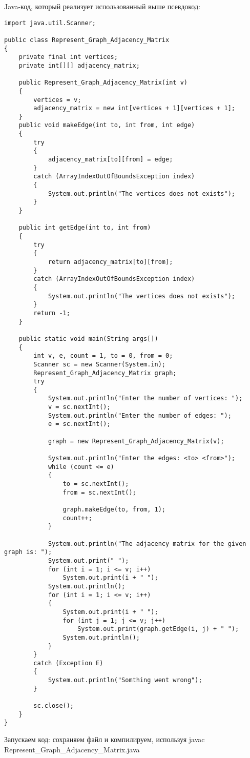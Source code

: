 \vspace{\baselineskip}
Java-код, который реализует использованный выше псевдокод:
\begin{tcolorbox}
\begin{verbatim}
import java.util.Scanner;

public class Represent_Graph_Adjacency_Matrix
{
	private final int vertices;
	private int[][] adjacency_matrix;
	
	public Represent_Graph_Adjacency_Matrix(int v)
	{
		vertices = v;
		adjacency_matrix = new int[vertices + 1][vertices + 1];
	}
	public void makeEdge(int to, int from, int edge)
	{
		try
		{
			adjacency_matrix[to][from] = edge;
		}
		catch (ArrayIndexOutOfBoundsException index)
		{
			System.out.println("The vertices does not exists");
		}
	}
	
	public int getEdge(int to, int from)
	{
		try
		{
			return adjacency_matrix[to][from];
		}
		catch (ArrayIndexOutOfBoundsException index)
		{
			System.out.println("The vertices does not exists");
		}
		return -1;
	}
	
	public static void main(String args[])
	{
		int v, e, count = 1, to = 0, from = 0;
		Scanner sc = new Scanner(System.in);
		Represent_Graph_Adjacency_Matrix graph;
		try
		{
			System.out.println("Enter the number of vertices: ");
			v = sc.nextInt();
			System.out.println("Enter the number of edges: ");
			e = sc.nextInt();
			
			graph = new Represent_Graph_Adjacency_Matrix(v);
			
			System.out.println("Enter the edges: <to> <from>");
			while (count <= e)
			{
				to = sc.nextInt();
				from = sc.nextInt();
				
				graph.makeEdge(to, from, 1);
				count++;
			}
			
			System.out.println("The adjacency matrix for the given graph is: ");
			System.out.print(" ");
			for (int i = 1; i <= v; i++)
				System.out.print(i + " ");
			System.out.println();
			for (int i = 1; i <= v; i++)
			{
				System.out.print(i + " ");
				for (int j = 1; j <= v; j++)
					System.out.print(graph.getEdge(i, j) + " ");
				System.out.println();
			}
		}
		catch (Exception E)
		{
			System.out.println("Somthing went wrong");
		}
		
		sc.close();
	}
}

\end{verbatim}
\end{tcolorbox}

Запускаем код: сохраняем файл и компилируем, используя javac Represent\_Graph\_Adjacency\_Matrix.java

